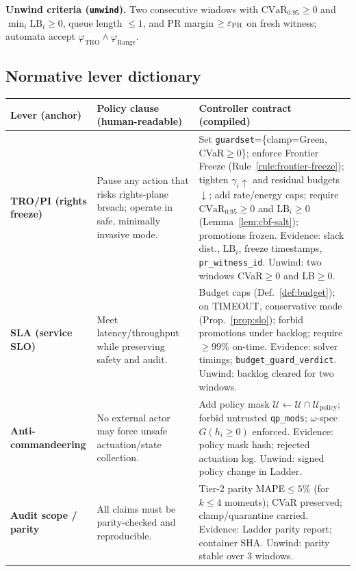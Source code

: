 \noindent\textbf{Unwind criteria (\texttt{unwind}).}
Two consecutive windows with $\mathrm{CVaR}_{0.95}\ge0$ and $\min_i \mathrm{LB}_i\ge0$, queue length $\le 1$, and PR margin $\ge\varepsilon_{\mathrm{PR}}$ on fresh witness; automata accept $\varphi_{\text{TRO}}\wedge\varphi_{\text{Range}}$.

\subsection{Normative lever dictionary}\label{subsec:lever-dict}
\emph{}

\begin{table}[t]
\centering
\renewcommand{\arraystretch}{1.12}
\begin{tabularx}{\textwidth}{@{}>{\raggedright\arraybackslash}p{2.8cm} >{\raggedright\arraybackslash}p{4.6cm} >{\raggedright\arraybackslash}X@{}}
\toprule
\textbf{Lever (anchor)} & \textbf{Policy clause (human-readable)} & \textbf{Controller contract (compiled)} \\
\midrule
\textbf{TRO/PI (rights freeze)} &
Pause any action that risks rights-plane breach; operate in safe, minimally invasive mode. &
Set \texttt{guardset}=\{clamp=Green, CVaR$\ge0$\}; enforce Frontier Freeze (Rule~\ref{rule:frontier-freeze}); tighten $\gamma_i\!\uparrow$ and residual budgets $\downarrow$; add rate/energy caps; require $\mathrm{CVaR}_{0.95}\!\ge0$ and $\mathrm{LB}_i\!\ge0$ (Lemma~\ref{lem:cbf-salt}); promotions frozen. Evidence: slack dist., $\mathrm{LB}_i$, freeze timestamps, \texttt{pr\_witness\_id}. Unwind: two windows CVaR$\ge0$ and LB$\ge0$. \\
\addlinespace
\textbf{SLA (service SLO)} &
Meet latency/throughput while preserving safety and audit. &
Budget caps (Def.~\ref{def:budget}); on TIMEOUT, conservative mode (Prop.~\ref{prop:slo}); forbid promotions under backlog; require $\ge99\%$ on-time. Evidence: solver timings; \texttt{budget\_guard\_verdict}. Unwind: backlog cleared for two windows. \\
\addlinespace
\textbf{Anti-commandeering} &
No external actor may force unsafe actuation/state collection. &
Add policy mask $\mathcal U\leftarrow \mathcal U\cap \mathcal U_{\mathrm{policy}}$; forbid untrusted \texttt{qp\_mods}; $\omega$-spec $G(h_i\!\ge0)$ enforced. Evidence: policy mask hash; rejected actuation log. Unwind: signed policy change in Ladder. \\
\addlinespace
\textbf{Audit scope / parity} &
All claims must be parity-checked and reproducible. &
Tier-2 parity MAPE$\le5\%$ (for $k\!\le\!4$ moments); CVaR preserved; clamp/quarantine carried. Evidence: Ladder parity report; container SHA. Unwind: parity stable over 3 windows. \\

\end{tabularx}
\end{table}
